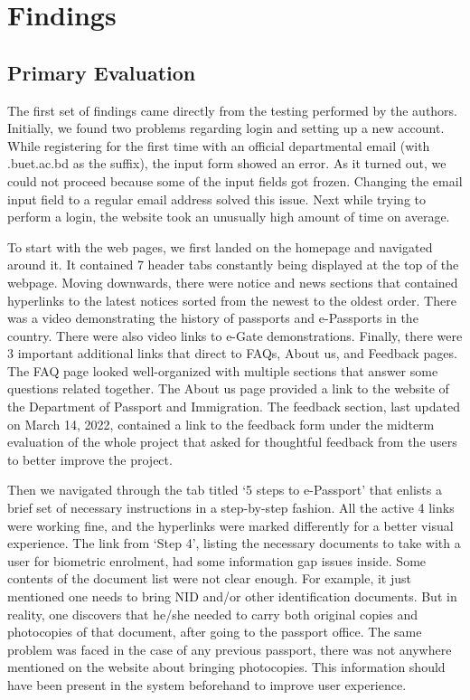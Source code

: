 \section{Findings}
\label{sec:result}
\subsection{Primary Evaluation}

The first set of findings came directly from the testing performed by the authors. Initially, we found two problems regarding login and setting up a new account. While registering for the first time with an official departmental email (with .buet.ac.bd as the suffix), the input form showed an error. As it turned out, we could not proceed because some of the input fields got frozen. Changing the email input field to a regular email address solved this issue. Next while trying to perform a login, the website took an unusually high amount of time on average. 

To start with the web pages, we first landed on the homepage and navigated around it. It contained 7 header tabs constantly being displayed at the top of the webpage. Moving downwards, there were notice and news sections that contained hyperlinks to the latest notices sorted from the newest to the oldest order. There was a video demonstrating the history of passports and e-Passports in the country. There were also video links to e-Gate demonstrations.
Finally, there were 3 important additional links that direct to FAQs, About us, and Feedback pages. The FAQ page looked well-organized with multiple sections that answer some questions related together. The About us page provided a link to the website of the Department of Passport and Immigration. The feedback section, last updated on March 14, 2022, contained a link to the feedback form under the midterm evaluation of the whole project that asked for thoughtful feedback from the users to better improve the project.

Then we navigated through the tab titled ‘5 steps to e-Passport’ that enlists a brief set of necessary instructions in a step-by-step fashion. All the active 4 links were working fine, and the hyperlinks were marked differently for a better visual experience. The link from ‘Step 4’, listing the necessary documents to take with a user for biometric enrolment, had some information gap issues inside. Some contents of the document list were not clear enough. For example, it just mentioned one needs to bring NID and/or other identification documents. But in reality, one discovers that he/she needed to carry both original copies and photocopies of that document, after going to the passport office. The same problem was faced in the case of any previous passport, there was not anywhere mentioned on the website about bringing photocopies. This information should have been present in the system beforehand to improve user experience.

